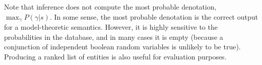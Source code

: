 \documentclass[11pt]{article}
\begin{document}
Note that inference does not compute the most probable denotation,
$\max_\gamma P(\gamma | s)$. In some sense, the most probable
denotation is the correct output for a model-theoretic
semantics. However, it is highly sensitive to the probabilities in the
database, and in many cases it is empty (because a conjunction of
independent boolean random variables is unlikely to be
true). Producing a ranked list of entities is also useful for
evaluation purposes.

% 
% 
% 
% 
% 
% 
% 
% 
% 
\end{document}
